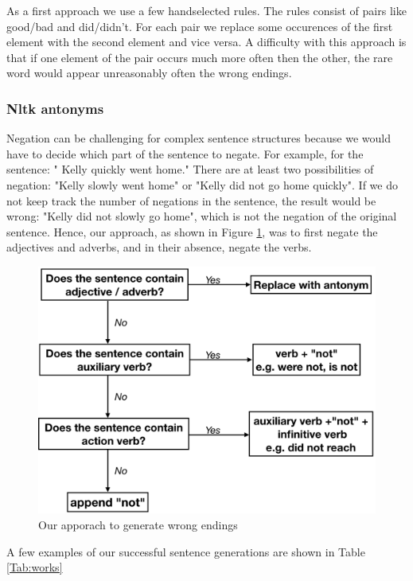 \documentclass{article}
\begin{document}
As a first approach we use a few handselected rules. The rules consist of pairs like good/bad and did/didn't. For each pair we replace some occurences of the first element with the second element and vice versa. A difficulty with this approach is that if one element of the pair occurs much more often then the other, the rare word would appear unreasonably often the wrong endings. 


\subsubsection{Nltk antonyms}

Negation can be challenging for complex sentence structures because we would have to decide which part of the sentence to negate. For example, for the sentence: "
Kelly quickly went home." There are at least two possibilities of negation: "Kelly slowly went home" or "Kelly did not go home quickly". If we do not keep track the number of negations in the sentence, the result would be wrong: "Kelly did not slowly go home", which is not the negation of the original sentence. Hence, our approach, as shown in Figure \ref{Figure:wrong}, was to first negate the adjectives and adverbs, and in their absence, negate the verbs.

\begin{figure}
  \centering
  \includegraphics[width=0.7 \linewidth]{fig/wrong.PNG}
  \caption{Our apporach to generate wrong endings}
  \label{Figure:wrong}
\end{figure}


A few examples of our successful sentence generations are shown in Table \ref{Tab:works}
\end{document}
